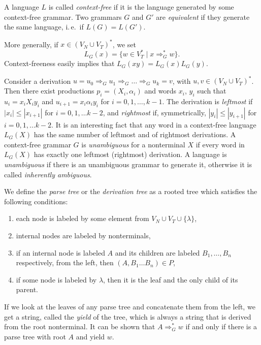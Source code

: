 A language $L$ is called \emph{context-free} if it is the language generated by some context-free grammar. Two grammars $G$ and $G'$ are \emph{equivalent} if they generate the same language, i.\,e.\ if $L(G) = L(G')$.

More generally, if $x \in (V_N \cup V_T)^*$, we set
$$L_G(x) = \{w \in V_T^* \mid x \Rightarrow^*_G w\}.$$
Context-freeness easily implies that $L_G(xy) = L_G(x) L_G(y)$.

Consider a derivation $u = u_0 \Rightarrow_G u_1 \Rightarrow_G \ldots \Rightarrow_G u_k = v$, with $u, v \in (V_N \cup V_T)^*$. Then there exist productions $p_i = (X_i, \alpha_i)$ and words $x_i$, $y_i$ such that $u_i = x_i X_i y_i$ and $u_{i+1} = x_i \alpha_i y_i$ for $i = 0, 1, \ldots, k-1$. The derivation is \emph{leftmost} if $|x_i| \le |x_{i+1}|$ for $i = 0, 1, \ldots k-2$, and \emph{rightmost} if, symmetrically, $|y_i| \le |y_{i+1}|$ for $i = 0, 1, \ldots k-2$. It is an interesting fact that any word in a context-free language $L_G(X)$ has the same number of leftmost and of rightmost derivations. A context-free grammar $G$ is \emph{unambiguous} for a nonterminal $X$ if every word in $L_G(X)$ has exactly one leftmost (rightmost) derivation. A language is \emph{unambiguous} if there is an unambiguous grammar to generate it, otherwise it is called \emph{inherently ambiguous}.

We define the \emph{parse tree} or the \emph{derivation tree} as a rooted tree which satisfies the following conditions:

\begin{enumerate}
\item each node is labeled by some element from $V_N \cup V_T \cup \{\lambda\}$,
\item internal nodes are labeled by nonterminals,
\item if an internal node is labeled $A$ and its children are labeled $B_1, \ldots, B_n$ respectively, from the left, then $(A, B_1 \ldots B_n) \in P$,
\item if some node is labeled by $\lambda$, then it is the leaf and the only child of its parent.
\end{enumerate}

If we look at the leaves of any parse tree and concatenate them from the left, we get a string, called the \emph{yield} of the tree, which is always a string that is derived from the root nonterminal. It can be shown that $A \Rightarrow^*_G w$ if and only if there is a parse tree with root $A$ and yield $w$.

